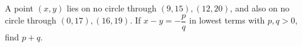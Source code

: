 A point $(x,y)$ lies on no circle through $(9,15),(12,20)$, and also on no circle through $(0,17),(16,19)$. If $x-y=-\dfrac{p}{q}$ in lowest terms with $p,q>0$, find $p+q$.
